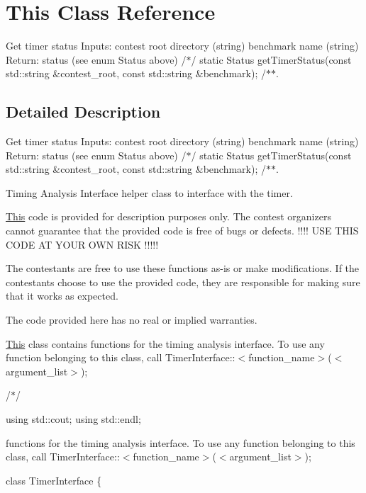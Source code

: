 \hypertarget{classThis}{\section{This Class Reference}
\label{classThis}
}


Get timer status Inputs\-: contest root directory (string) benchmark name (string) Return\-: status (see enum Status above) /$\ast$/ static Status get\-Timer\-Status(const std\-::string \&contest\-\_\-root, const std\-::string \&benchmark); /$\ast$$\ast$.  




\subsection{Detailed Description}
Get timer status Inputs\-: contest root directory (string) benchmark name (string) Return\-: status (see enum Status above) /$\ast$/ static Status get\-Timer\-Status(const std\-::string \&contest\-\_\-root, const std\-::string \&benchmark); /$\ast$$\ast$. 

Timing Analysis Interface helper class to interface with the timer.

\hyperlink{classThis}{This} code is provided for description purposes only. The contest organizers cannot guarantee that the provided code is free of bugs or defects. !!!! U\-S\-E T\-H\-I\-S C\-O\-D\-E A\-T Y\-O\-U\-R O\-W\-N R\-I\-S\-K !!!!!

The contestants are free to use these functions as-\/is or make modifications. If the contestants choose to use the provided code, they are responsible for making sure that it works as expected.

The code provided here has no real or implied warranties.

\hyperlink{classThis}{This} class contains functions for the timing analysis interface. To use any function belonging to this class, call Timer\-Interface\-:\-:$<$function\-\_\-name$>$($<$argument\-\_\-list$>$);

/$\ast$/ 



using std\-::cout; using std\-::endl;

functions for the timing analysis interface. To use any function belonging to this class, call Timer\-Interface\-:\-:$<$function\-\_\-name$>$($<$argument\-\_\-list$>$);

class Timer\-Interface \{

